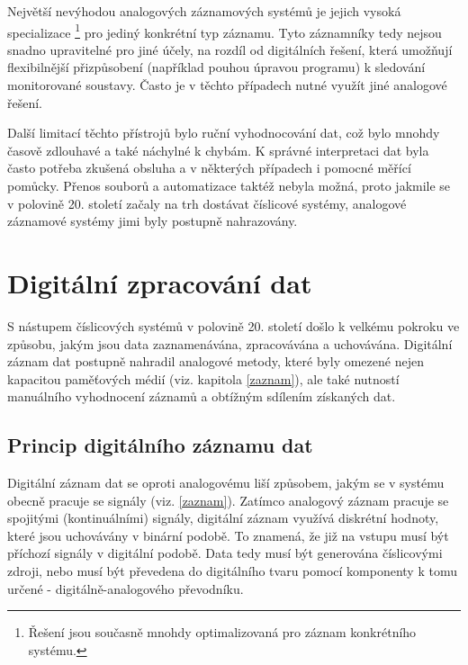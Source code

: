 Největší nevýhodou analogových záznamových systémů je jejich vysoká specializace \footnote{Řešení jsou současně mnohdy optimalizovaná pro záznam konkrétního systému.} pro jediný konkrétní typ záznamu. Tyto záznamníky tedy nejsou snadno upravitelné pro jiné účely, na rozdíl od digitálních řešení, která umožňují flexibilnější přizpůsobení (například pouhou úpravou programu) k sledování monitorované soustavy. Často je v těchto případech nutné využít jiné analogové řešení. \cite{analog_signal_and_digital_signal_processing_Tel_System}

Další limitací těchto přístrojů bylo ruční vyhodnocování dat, což bylo mnohdy časově zdlouhavé a také náchylné k chybám. K správné interpretaci dat byla často potřeba zkušená obsluha a v některých případech i pomocné měřící pomůcky. Přenos souborů a automatizace taktéž nebyla možná, proto jakmile se v polovině 20. století začaly na trh dostávat číslicové systémy, analogové záznamové systémy jimi byly postupně nahrazovány. \cite{newcastle_history_of_digital_computers, florian_prechod_a_analog_do_digital}


\section{Digitální zpracování dat}
\label{digitalni_zaznam_dat}
S nástupem číslicových systémů v polovině 20. století došlo k velkému pokroku ve způsobu, jakým jsou data zaznamenávána, zpracovávána a uchovávána. Digitální záznam dat postupně nahradil analogové metody, které byly omezené nejen kapacitou paměťových médií (viz. kapitola \ref{zaznam}), ale také nutností manuálního vyhodnocení záznamů a obtížným sdílením získaných dat.

\subsection{Princip digitálního záznamu dat}
Digitální záznam dat se oproti analogovému liší způsobem, jakým se v systému obecně pracuje se signály (viz. \ref{zaznam}). Zatímco analogový záznam pracuje se spojitými (kontinuálními) signály, digitální záznam využívá diskrétní hodnoty, které jsou uchovávány v binární podobě. To znamená, že již na vstupu musí být příchozí signály v digitální podobě. Data tedy musí být generována číslicovými zdroji, nebo musí být převedena do digitálního tvaru pomocí komponenty k tomu určené - digitálně-analogového převodníku. 

